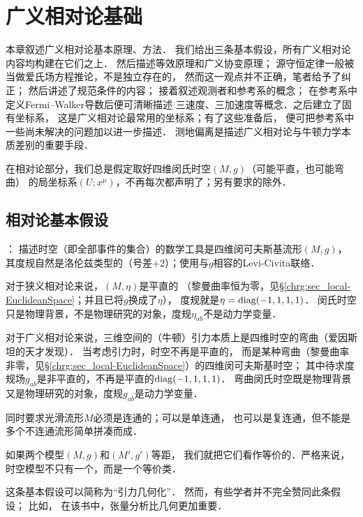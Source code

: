 
\chapter{广义相对论基础}\label{chfd}

本章叙述广义相对论基本原理、方法．
我们给出三条基本假设，所有广义相对论内容均构建在它们之上．
然后描述等效原理和广义协变原理；
源守恒定律一般被当做爱氏场方程推论，不是独立存在的，
然而这一观点并不正确，笔者给予了纠正；
然后讲述了规范条件的内容；
接着叙述观测者和参考系的概念；
在参考系中定义Fermi--Walker导数后便可清晰描述
三速度、三加速度等概念．之后建立了固有坐标系，
这是广义相对论最常用的坐标系；有了这些准备后，
便可把参考系中一些尚未解决的问题加以进一步描述．
测地偏离是描述广义相对论与牛顿力学本质差别的重要手段．



在相对论部分，我们总是假定取好四维闵氏时空$(M,g)$（可能平直，也可能弯曲）
的局坐标系$(U;x^\mu)$，不再每次都声明了；另有要求的除外．

\section{相对论基本假设}\label{chfd:sec_Fundamental-Postulate}

\noindent{}：
描述时空（即全部事件的集合）的数学工具是四维闵可夫斯基流形$(M,g)$，
其度规自然是洛伦兹类型的（号差$+2$）；使用与$g$相容的Levi-Civita联络．

对于狭义相对论来说，$(M,\eta)$是平直的
（黎曼曲率恒为零，见\S\ref{chrg:sec_local-EuclideanSpace}；并且已将$g$换成了$\eta$），
度规就是$\eta={\rm diag}(-1,1,1,1)$．
闵氏时空只是物理背景，不是物理研究的对象，度规$\eta_{ab}$不是动力学变量．


对于广义相对论来说，三维空间的（牛顿）引力本质上是四维时空的弯曲（爱因斯坦的天才发现）．
当考虑引力时，时空不再是平直的，
而是某种弯曲（黎曼曲率非零，见\S\ref{chrg:sec_local-EuclideanSpace}）的四维闵可夫斯基时空；
其中待求度规场$g_{ab}$是非平直的，不再是平直的${\rm diag}(-1,1,1,1)$．
弯曲闵氏时空既是物理背景又是物理研究的对象，度规$g_{ab}$是动力学变量．

同时要求光滑流形$M$必须是连通的；可以是单连通，
也可以是复连通，但不能是多个不连通流形简单拼凑而成．

如果两个模型$(M,g)$和$(M',g')${\kaishu 等距}，
我们就把它们看作等价的．严格来说，时空模型不只有一个，而是一个等价类．

这条基本假设可以简称为“引力几何化”．
然而，有些学者并不完全赞同此条假设；
比如\textcite[\S 6.9]{weinberg_grav-1972}，
在该书中，张量分析比几何更加重要．


